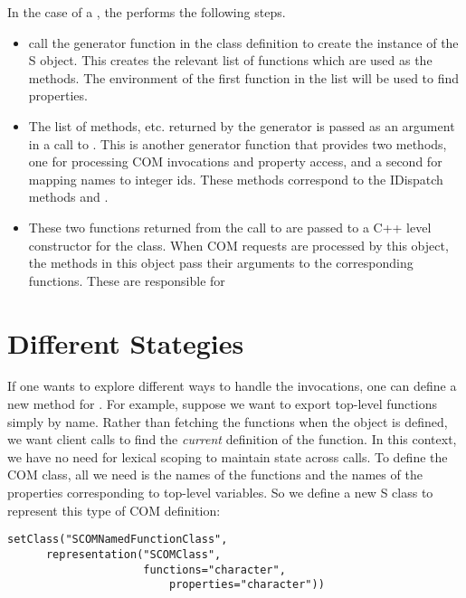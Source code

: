 \documentclass[11pt]{article}
\begin{document}
In the case of a , the
 performs the following steps.
\begin{itemize}
\item call the generator function in the class definition
 to create the instance of the S object. This creates the
 relevant list of functions which are used as the methods.
 The environment of the first function in the list will be used to 
 find properties. 

\item   The list of methods, etc. returned by the generator
  is passed as an argument in a call to .
  This is another generator function that provides two methods,
  one for processing COM invocations and property access,
  and a second for mapping names to integer ids.
  These methods correspond to the IDispatch methods
   and .
  
\item These two functions returned from the call to 
  are passed to a C++ level constructor for the  class.
  When COM requests are processed by this object, the methods in this object pass
  their arguments to the corresponding functions. These are responsible for 


\end{itemize}

\section{Different Stategies}
If one wants to explore different ways to handle the invocations, one
can define a new method for .  For example,
suppose we want to export top-level functions simply by name. Rather
than fetching the functions when the object is defined, we want client
calls to find the \textit{current} definition of the function.  In
this context, we have no need for lexical scoping to maintain state
across calls.  To define the COM class, all we need is the names of
the functions and the names of the properties corresponding to
top-level variables.  So we define a new S class to represent this
type of COM definition:
\begin{verbatim}
setClass("SCOMNamedFunctionClass",
	  representation("SCOMClass",
	                 functions="character",
                         properties="character"))
\end{verbatim}
\end{document}
